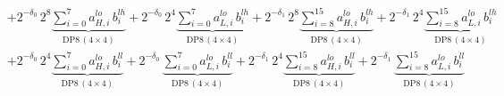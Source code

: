 \documentclass[fleqn]{article}
\newcommand{\DPop}[3]{\mathrm{DP#1}\,(#2\!\times\!#3)}
\begin{document}
{\begin{align*}
  & + 2^{-\delta_0}\,2^{8}\underbrace{\sum_{i=0}^{7} a_{H,i}^{lo}\, b_i^{lh}}_{\DPop{8}{4}{4}}
  + 2^{-\delta_0}\,2^{4}\underbrace{\sum_{i=0}^{7} a_{L,i}^{lo}\, b_i^{lh}}_{\DPop{8}{4}{4}}
  + 2^{-\delta_1}\,2^{8}\underbrace{\sum_{i=8}^{15} a_{H,i}^{lo}\, b_i^{lh}}_{\DPop{8}{4}{4}}
  + 2^{-\delta_1}\,2^{4}\underbrace{\sum_{i=8}^{15} a_{L,i}^{lo}\, b_i^{lh}}_{\DPop{8}{4}{4}} \\[1em]
  & + 2^{-\delta_0}\,2^{4}\underbrace{\sum_{i=0}^{7} a_{H,i}^{lo}\, b_i^{ll}}_{\DPop{8}{4}{4}}
  + 2^{-\delta_0}\,\underbrace{\sum_{i=0}^{7} a_{L,i}^{lo}\, b_i^{ll}}_{\DPop{8}{4}{4}}
  + 2^{-\delta_1}\,2^{4}\underbrace{\sum_{i=8}^{15} a_{H,i}^{lo}\, b_i^{ll}}_{\DPop{8}{4}{4}}
  + 2^{-\delta_1}\,\underbrace{\sum_{i=8}^{15} a_{L,i}^{lo}\, b_i^{ll}}_{\DPop{8}{4}{4}}
\end{align*}
}
\end{document}
